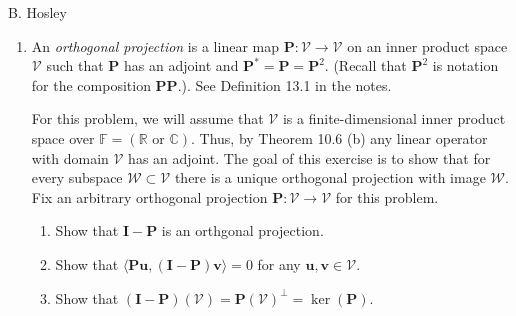 \documentclass[12pt]{amsart}
\newcommand{\1}{\mathbbm{1}}
\newcounter{Theorem}
\newcounter{Definition}
\numberwithin{equation}{section}
\numberwithin{Theorem}{section}
\theoremstyle{plain} %
\theoremstyle{definition}
\theoremstyle{remark}
\begin{document}
\thispagestyle{empty}

\hspace{\fill} {\Large B. Hosley}
\bigskip \raggedbottom


\begin{enumerate}[1.]

\item An \textit{orthogonal projection} is a linear map \(\mathbf{P}:\mathcal{V}\to\mathcal{V}\) on an inner product space \(\mathcal{V}\) such that \(\mathbf{P}\) has an adjoint and \(\mathbf{P}^{\ast} = \mathbf{P} = \mathbf{P}^{2}\). (Recall that \(\mathbf{P}^{2}\) is notation for the composition \(\mathbf{PP}.\)). See Definition 13.1 in the notes.


\bigskip

\noindent For this problem, we will assume that \(\mathcal{V}\) is a finite-dimensional inner product space over \(\mathbb{F}=(\mathbb{R}\text{ or }\mathbb{C})\). Thus, by Theorem 10.6 (b) any linear operator with domain \(\mathcal{V}\) has an adjoint. The goal of this exercise is to show that for every subspace \(\mathcal{W}\subset\mathcal{V}\) there is a unique orthogonal projection with image \(\mathcal{W}\). Fix an arbitrary orthogonal projection \(\mathbf{P}:\mathcal{V}\to\mathcal{V}\) for this problem.\bigskip

\begin{enumerate}

\item Show that \(\mathbf{I}-\mathbf{P}\) is an orthgonal projection.\bigskip

\item Show that \(\langle \mathbf{Pu},(\mathbf{I}-\mathbf{P})\mathbf{v}\rangle = 0\) for any \(\mathbf{u},\mathbf{v}\in\mathcal{V}\).\bigskip

\item Show that \((\mathbf{I}-\mathbf{P})(\mathcal{V}) = \mathbf{P}(\mathcal{V})^{\bot} = \operatorname{ker}(\mathbf{P})\).\bigskip

\end{enumerate}


\end{enumerate}
\end{document}

